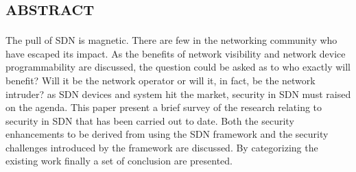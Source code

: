 %
\section*{\small \textsc{abstract}}
The pull of \ac{SDN} is magnetic. There are few in the networking community who have escaped its impact. As the benefits of network visibility and network device programmability are discussed, the question could be asked as to who exactly will benefit? Will it be the network operator or will it, in fact, be the network intruder? as \ac{SDN} devices and system hit the market, security in \ac{SDN} must raised on the agenda. This paper present a brief survey of the research relating to security in \ac{SDN} that has been carried out to date. Both the security enhancements to be derived from using the \ac{SDN} framework and the security challenges introduced by the framework are discussed. By categorizing the existing work finally a set of conclusion are presented.
